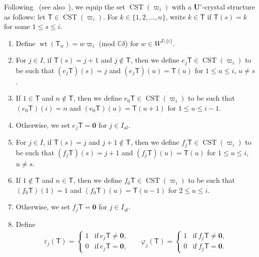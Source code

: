 \documentclass[ALCO,ThmDefs,Unicode,epreuves]{cedram}
\newcommand{\BC}{\mathbb{C}}
\newcommand\bm[1]{\boldsymbol{#1}}
\renewcommand{\U}{\mathbf{U}}
\DeclareMathOperator{\af}{af}
\DeclareMathOperator{\wt}{wt}
\DeclareMathOperator{\CST}{CST}
\begin{document}
Following~\cite[\S~3.7]{S} (see also~\cite[\S~4.1]{KMN}), we equip the set 
$\CST (\varpi_i)$
with a $\U'$-crystal structure as follows: 
let 
$\mathsf{T} \in \CST (\varpi_i)$. 
For 
$k \in \{ 1,2,\ldots ,n \}$, 
write 
$k \in \mathsf{T}$ 
if 
$\mathsf{T}(s) = k$
for some 
$1 \leq s \leq i$.
\begin{enumerate}[label=(\roman*)]
\item
Define 
$\wt (\mathsf{T}_w) = w\varpi_i$ (mod $\BC \delta$) 
for 
$w \in W^{I \setminus \{ i \}}$. 
\item
For $j \in I$, 
if 
$\mathsf{T}(s) = j+1$ 
and 
$j \notin \mathsf{T}$, 
then we define 
$e_j \mathsf{T} \in \CST (\varpi_i)$ 
to be such that 
$(e_j \mathsf{T})(s) = j$ 
and 
$(e_j \mathsf{T})(u) = \mathsf{T}(u)$ 
for 
$1 \leq u \leq i$, $u \neq s$. 
\item
If 
$1 \in \mathsf{T}$
and 
$n \notin \mathsf{T}$, 
then we define 
$e_0 \mathsf{T} \in \CST (\varpi_i)$ 
to be such that 
$(e_0 \mathsf{T})(i) = n$ 
and 
$(e_0 \mathsf{T})(u) = \mathsf{T}(u+1)$ 
for 
$1 \leq u \leq i-1$.
\item
Otherwise, we set 
$e_j \mathsf{T} = \bm{0}$
for $j \in I_{\af}$.
\item
For $j \in I$, 
if
$\mathsf{T}(s) = j$ 
and 
$j+1 \notin \mathsf{T}$, 
then we define 
$f_j \mathsf{T} \in \CST (\varpi_i)$ 
to be such that 
$(f_j \mathsf{T})(s) = j+1$ 
and 
$(f_j \mathsf{T})(u) = \mathsf{T}(u)$ 
for 
$1 \leq u \leq i$, $u \neq s$. 
\item
If 
$1 \notin \mathsf{T}$ 
and 
$n \in \mathsf{T}$, 
then we define 
$f_0 \mathsf{T} \in \CST (\varpi_i)$ 
to be such that 
$(f_0 \mathsf{T})(1) = 1$ 
and 
$(f_0 \mathsf{T})(u) = \mathsf{T}(u-1)$ 
for 
$2 \leq u \leq i$.
\item
Otherwise, we set 
$f_j \mathsf{T} = \bm{0}$
for $j \in I_{\af}$. 
\item
Define
\begin{align} \label{eq:CST}
\varepsilon_j(\mathsf{T}) 
=
\begin{cases}
1 & \text{if} \ e_j \mathsf{T} \neq \bm{0}, \\%
0 & \text{if} \ e_j \mathsf{T} = \bm{0},
\end{cases}
&&
\varphi_j(\mathsf{T}) 
=
\begin{cases}
1 & \text{if} \ f_j \mathsf{T} \neq \bm{0}, \\%
0 & \text{if} \ f_j \mathsf{T} = \bm{0}.
\end{cases}
\end{align}
\end{enumerate}
\end{document}
